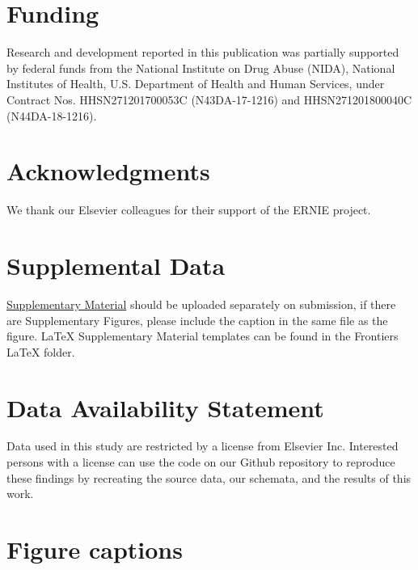 \documentclass[utf8]{frontiersSCNS}
\begin{document}
\section*{Funding} Research and development reported in this publication was partially supported by federal funds from the National Institute on Drug Abuse (NIDA), National Institutes of Health, U.S. Department of Health and Human Services, under Contract Nos. HHSN271201700053C (N43DA-17-1216) and HHSN271201800040C (N44DA-18-1216).

\section*{Acknowledgments}
We thank our Elsevier colleagues for their support of the ERNIE project. 

\section*{Supplemental Data}
 \href{http://home.frontiersin.org/about/author-guidelines#SupplementaryMaterial}{Supplementary Material} should be uploaded separately on submission, if there are Supplementary Figures, please include the caption in the same file as the figure. LaTeX Supplementary Material templates can be found in the Frontiers LaTeX folder.

\section*{Data Availability Statement}
Data used in this study are restricted by a license from Elsevier Inc. Interested persons with a license can use the code on our Github repository to reproduce these findings by recreating the source data, our schemata, and the results of this work.

 


\section*{Figure captions}
\end{document}
